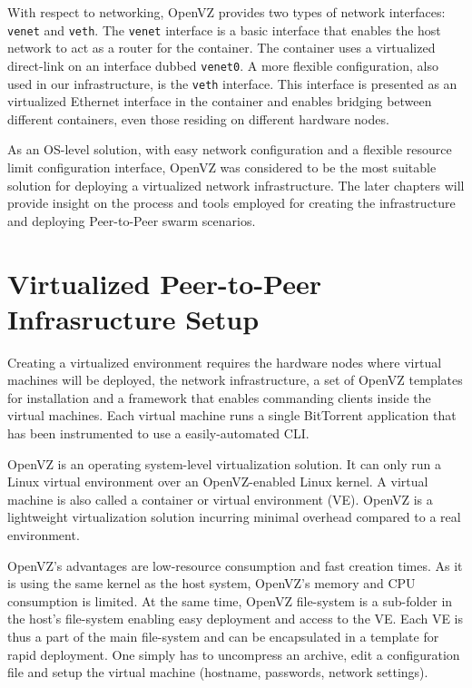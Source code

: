 With respect to networking, OpenVZ provides two types of network interfaces:
\texttt{venet} and \texttt{veth}. The \texttt{venet} interface is a basic
interface that enables the host network to act as a router for the container.
The container uses a virtualized direct-link on an interface dubbed
\texttt{venet0}. A more flexible configuration, also used in our
infrastructure, is the \texttt{veth} interface. This interface is presented as
an virtualized Ethernet interface in the container and enables bridging
between different containers, even those residing on different hardware nodes.

As an OS-level solution, with easy network configuration and a flexible
resource limit configuration interface, OpenVZ was considered to be the most
suitable solution for deploying a virtualized network infrastructure. The
later chapters will provide insight on the process and tools employed for
creating the infrastructure and deploying Peer-to-Peer swarm scenarios.

\section{Virtualized Peer-to-Peer Infrasructure Setup}
\label{sec:virt-infra:setup}

Creating a virtualized environment requires the hardware nodes where virtual
machines will be deployed, the network infrastructure, a set of OpenVZ
templates for installation and a framework that enables commanding clients
inside the virtual machines.  Each virtual machine runs a single BitTorrent
application that has been instrumented to use a easily-automated CLI.

OpenVZ is an operating system-level virtualization solution. It
can only run a Linux virtual environment over an OpenVZ-enabled Linux kernel.
A virtual machine is also called a container or virtual environment (VE).
OpenVZ is a lightweight virtualization solution incurring minimal overhead
compared to a real environment.

OpenVZ's advantages are low-resource consumption and fast creation times. As
it is using the same kernel as the host system, OpenVZ's memory and CPU
consumption is limited. At the same time, OpenVZ file-system is a sub-folder
in the host's file-system enabling easy deployment and access to the VE. Each
VE is thus a part of the main file-system and can be encapsulated in a
template for rapid deployment. One simply has to uncompress an archive, edit a
configuration file and setup the virtual machine (hostname, passwords, network
settings).

